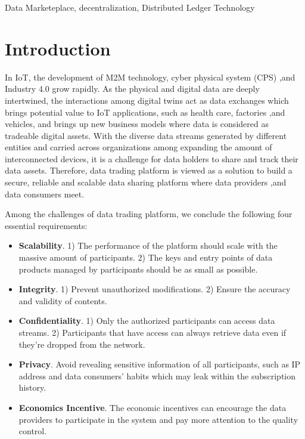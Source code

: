 \documentclass[conference]{IEEEtran}
\begin{document}
\begin{IEEEkeywords}
Data Marketeplace, decentralization, Distributed Ledger Technology
\end{IEEEkeywords}

\section{Introduction}
In IoT, the development of M2M technology\cite{M2M}, cyber physical system (CPS)\cite{CPS} ,and Industry 4.0 grow rapidly. As the physical and digital data are deeply intertwined, the interactions among digital twins act as data exchanges\cite{digitaltwin} which brings potential value to IoT applications, such as health care\cite{healthCare}, factories ,and vehicles\cite{AutonomousDriving}, and brings up new business models where data is considered as tradeable digital assets. With the diverse data streams generated by different entities and carried across organizations among expanding the amount of interconnected devices, it is a challenge for data holders to share and track their data assets. Therefore, data trading platform is viewed as a solution to build a secure, reliable and scalable data sharing platform where data providers ,and data consumers meet.

Among the challenges of data trading platform\cite{BigDataMarket}, we conclude the following four essential requirements:
\begin{itemize}
	\item \textbf{Scalability}. 
1) The performance of the platform should scale with the massive amount of participants. 2) The keys and entry points of data products managed by participants should be as small as possible. 
	\item \textbf{Integrity}. 1) Prevent unauthorized modifications. 2) Ensure the accuracy and validity of contents.	
	\item \textbf{Confidentiality}. 
1) Only the authorized participants can access data streams. 2) Participants that have access can always retrieve data even if they're dropped from the network.	
	\item \textbf{Privacy}. Avoid revealing sensitive information of all participants, such as IP address and data consumers' habits which may leak within the subscription history.
	\item \textbf{Economics Incentive}. The economic incentives can encourage the data providers to participate in the system and pay more attention to the quality control. 
\end{itemize}
\end{document}
